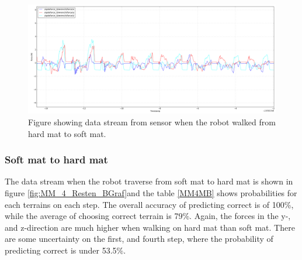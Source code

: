 \documentclass[USenglish]{ifimaster}  %
\begin{document}
	
	
	\begin{figure}[h]
		\centering
		\includegraphics[width=\textwidth,height=\textheight,keepaspectratio]{Figures/MB3MM}
		\caption{Figure showing data stream from sensor when the robot walked from hard mat to soft mat.}
		\label{fig:hardmatSoftMat}
	\end{figure}
	
	\begin{table}[h]
		\centering
		\caption{The table showing probability of each terrain per step walking from hard mat to soft mat. Marked green represent correct prediction and correct terrain, red represent wrong prediction and yellow is the correct prediction if it got wrong.}
		\label{hardmatSoftMat}
	\end{table}
	\FloatBarrier
	\clearpage
	
\subsubsection{Soft mat to hard mat}
The data stream when the robot traverse from soft mat to hard mat is shown in figure \ref{fig:MM_4_Resten_BGraf}and the table \ref{MM4MB} shows probabilities for each terrains on each step. The overall accuracy of predicting correct is of 100\%, while the average of choosing correct terrain is 79\%. Again, the forces in the y-, and z-direction are much higher when walking on hard mat than soft mat. There are some uncertainty on the first, and fourth step, where the probability of predicting correct is under 53.5\%. 
\end{document}
